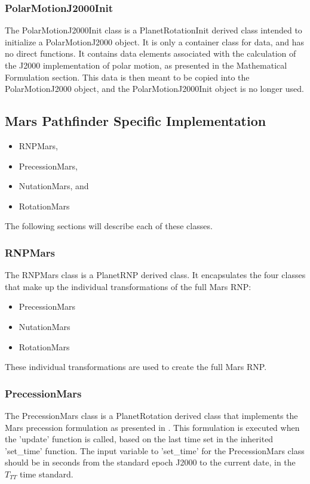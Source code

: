 \subsubsection{PolarMotionJ2000Init}

The PolarMotionJ2000Init class is a PlanetRotationInit derived class
intended to initialize a PolarMotionJ2000 object. It is only a container
class for data, and has no direct functions. It contains data
elements associated with the calculation of the J2000 implementation
of polar motion, as presented in the Mathematical Formulation section.
This data
is then meant to be copied into the PolarMotionJ2000 object, and the
PolarMotionJ2000Init object is no longer used.

\subsection{Mars Pathfinder Specific Implementation}

\begin{itemize}
\item{RNPMars},
\item{PrecessionMars},
\item{NutationMars}, and
\item{RotationMars}
\end{itemize}

The following sections will describe each of these classes.

\subsubsection{RNPMars}

The RNPMars class is a PlanetRNP derived class. It encapsulates the four
classes that make up the individual transformations of the full Mars RNP:

\begin{itemize}
\item{PrecessionMars}
\item{NutationMars}
\item{RotationMars}
\end{itemize}

These individual transformations are used to create the full Mars RNP.

\subsubsection{PrecessionMars}

The PrecessionMars class is a PlanetRotation derived class that implements the
Mars precession formulation as presented in \cite{Konopliv06}.
This formulation is executed when the 'update' function is called, based
on the last time set in the inherited 'set\_time' function. The input
variable to 'set\_time' for the PrecessionMars class should be in
seconds from the standard epoch J2000 to the current date, in the
$T_{TT}$ time standard.

